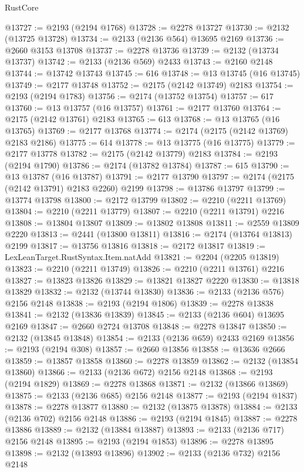 \begin{lexlean}{RustCore}
\begin{coremodule}
@13727 := @2193 (@2194 @1768)
@13728 := @2278 @13727
@13730 := @2132 (@13725 @13728)
@13734 := @2133 (@2136 @564) @13695 @2169
@13736 := @2660 @3153 @13708
@13737 := @2278 @13736
@13739 := @2132 (@13734 @13737)
@13742 := @2133 (@2136 @569) @2433
@13743 := @2160 @2148
@13744 := @13742 @13743
@13745 := 616
@13748 := @13 @13745 (@16 @13745)
@13749 := @2177 @13748
@13752 := @2175 (@2142 @13749) @2183
@13754 := @2193 (@2194 @1783)
@13756 := @2174 (@13752 @13754)
@13757 := 617
@13760 := @13 @13757 (@16 @13757)
@13761 := @2177 @13760
@13764 := @2175 (@2142 @13761) @2183
@13765 := 613
@13768 := @13 @13765 (@16 @13765)
@13769 := @2177 @13768
@13774 := @2174 (@2175 (@2142 @13769) @2183 @2186)
@13775 := 614
@13778 := @13 @13775 (@16 @13775)
@13779 := @2177 @13778
@13782 := @2175 (@2142 @13779) @2183
@13784 := @2193 (@2194 @1790)
@13786 := @2174 (@13782 @13784)
@13787 := 615
@13790 := @13 @13787 (@16 @13787)
@13791 := @2177 @13790
@13797 := @2174 (@2175 (@2142 @13791) @2183 @2260) @2199
@13798 := @13786 @13797
@13799 := @13774 @13798
@13800 := @2172 @13799
@13802 := @2210 (@2211 @13769)
@13804 := @2210 (@2211 @13779)
@13807 := @2210 (@2211 @13791) @2216
@13808 := @13804 @13807
@13809 := @13802 @13808
@13811 := @2559 @13809 @2220
@13813 := @2441 (@13800 @13811)
@13816 := @2174 (@13764 @13813) @2199
@13817 := @13756 @13816
@13818 := @2172 @13817
@13819 := LexLeanTarget.RustSyntax.Item.natAdd
@13821 := @2204 (@2205 @13819)
@13823 := @2210 (@2211 @13749)
@13826 := @2210 (@2211 @13761) @2216
@13827 := @13823 @13826
@13829 := @13821 @13827 @2220
@13830 := @13818 @13829
@13832 := @2132 (@13744 @13830)
@13836 := @2133 (@2136 @576) @2156 @2148
@13838 := @2193 (@2194 @1806)
@13839 := @2278 @13838
@13841 := @2132 (@13836 @13839)
@13845 := @2133 (@2136 @604) @13695 @2169
@13847 := @2660 @2724 @13708
@13848 := @2278 @13847
@13850 := @2132 (@13845 @13848)
@13854 := @2133 (@2136 @659) @2433 @2169
@13856 := @2193 (@2194 @308)
@13857 := @2660 @13856
@13858 := @13636 @2666
@13859 := @13857 @13858
@13860 := @2278 @13859
@13862 := @2132 (@13854 @13860)
@13866 := @2133 (@2136 @672) @2156 @2148
@13868 := @2193 (@2194 @1829)
@13869 := @2278 @13868
@13871 := @2132 (@13866 @13869)
@13875 := @2133 (@2136 @685) @2156 @2148
@13877 := @2193 (@2194 @1837)
@13878 := @2278 @13877
@13880 := @2132 (@13875 @13878)
@13884 := @2133 (@2136 @702) @2156 @2148
@13886 := @2193 (@2194 @1845)
@13887 := @2278 @13886
@13889 := @2132 (@13884 @13887)
@13893 := @2133 (@2136 @717) @2156 @2148
@13895 := @2193 (@2194 @1853)
@13896 := @2278 @13895
@13898 := @2132 (@13893 @13896)
@13902 := @2133 (@2136 @732) @2156 @2148

\end{coremodule}
\end{lexlean}

